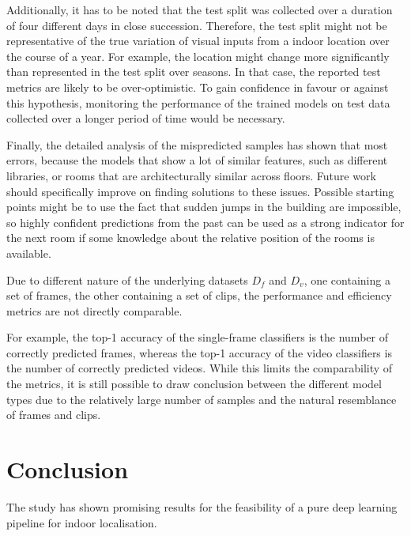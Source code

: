 \documentclass[a4paper]{article}
\begin{document}
Additionally, it has to be noted that the test split was collected over a
duration of four different days in close succession. Therefore, the test split
might not be representative of the true variation of visual inputs from a
indoor location over the course of a year. For example, the location might
change more significantly than represented in the test split over seasons.
In that case, the reported test metrics are likely to be over-optimistic. To
gain confidence in favour or against this hypothesis, monitoring the
performance of the trained models on test data collected over a longer period
of time would be necessary.

Finally, the detailed analysis of the mispredicted samples has shown that
most errors, because the models that show a lot of similar features, such as
different libraries, or rooms that are architecturally similar across floors.
Future work should specifically improve on finding solutions to these issues.
Possible starting points might be to use the fact that sudden jumps in the
building are impossible, so highly confident predictions from the past can be
used as a strong indicator for the next room if some knowledge about the
relative position of the rooms is available.

Due to different nature of the underlying datasets $D_f$ and $D_v$, one
containing a set of frames, the other containing a set of clips,  the
performance and efficiency metrics are not directly comparable.

For example, the top-1 accuracy of the single-frame classifiers is the number of
correctly predicted frames, whereas the top-1 accuracy of the video classifiers
is the number of correctly predicted videos. While this limits the comparability
of the metrics, it is still possible to draw conclusion between the different
model types due to the relatively large number of samples and the natural
resemblance of frames and clips.


\section{Conclusion} %
\label{sec:conclusion}

The study has shown promising results for the feasibility of a pure deep
learning pipeline for indoor localisation.
\end{document}
